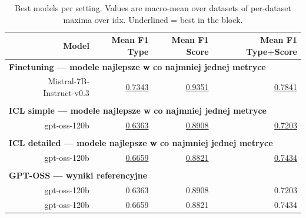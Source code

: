 \begin{table}[t]
\centering
\small
\setlength{\tabcolsep}{6pt}
\begin{tabular}{lrrrr}
\hline
 & Model & Mean F1 Type & Mean F1 Score & Mean F1 Type+Score \\
\hline
\multicolumn{5}{l}{\textbf{Finetuning — modele najlepsze w co najmniej jednej metryce}} \\
 & Mistral-7B-Instruct-v0.3 & \underline{0.7343} & \underline{0.9351} & \underline{0.7841} \\
\hline \\
\multicolumn{5}{l}{\textbf{ICL simple — modele najlepsze w co najmniej jednej metryce}} \\
 & gpt-oss-120b & \underline{0.6363} & \underline{0.8908} & \underline{0.7203} \\
\hline \\
\multicolumn{5}{l}{\textbf{ICL detailed — modele najlepsze w co najmniej jednej metryce}} \\
 & gpt-oss-120b & \underline{0.6659} & \underline{0.8821} & \underline{0.7434} \\
\hline \\
\multicolumn{5}{l}{\textbf{GPT-OSS — wyniki referencyjne}} \\
 & gpt-oss-120b & 0.6363 & 0.8908 & 0.7203 \\
 & gpt-oss-120b & 0.6659 & 0.8821 & 0.7434 \\
\hline
\end{tabular}
\caption{Best models per setting. Values are macro-mean over datasets of per-dataset maxima over idx. Underlined = best in the block.}
\end{table}